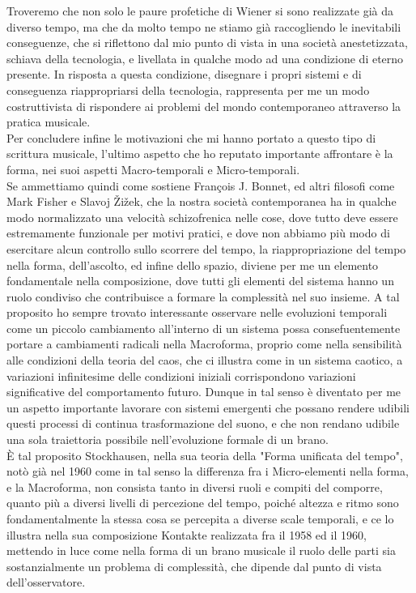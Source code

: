 Troveremo che non solo le paure profetiche di Wiener si sono realizzate già da diverso tempo, 
ma che da molto tempo ne stiamo già raccogliendo le inevitabili conseguenze,
che si riflettono dal mio punto di vista in una società anestetizzata, 
schiava della tecnologia, e livellata in qualche modo ad una condizione di eterno presente.
In risposta a questa condizione, disegnare i propri sistemi e di conseguenza riappropriarsi della tecnologia,
rappresenta per me un modo costruttivista di rispondere ai problemi del mondo contemporaneo
attraverso la pratica musicale.\\
Per concludere infine le motivazioni che mi hanno portato a questo tipo di scrittura musicale, 
l'ultimo aspetto che ho reputato importante affrontare è la forma,
nei suoi aspetti Macro-temporali e Micro-temporali. \\
Se ammettiamo quindi come sostiene François J. Bonnet, ed altri filosofi come Mark Fisher e Slavoj Žižek,
che la nostra società contemporanea ha in qualche modo normalizzato
una velocità schizofrenica nelle cose, dove tutto deve essere estremamente funzionale per motivi pratici,
e dove non abbiamo più modo di esercitare alcun controllo sullo scorrere del tempo,
la riappropriazione del tempo nella forma, dell'ascolto, ed infine dello spazio, diviene per me un elemento fondamentale
nella composizione,
dove tutti gli elementi del sistema hanno un ruolo condiviso che contribuisce a formare la complessità nel suo insieme.
A tal proposito ho sempre trovato interessante osservare nelle evoluzioni temporali 
come un piccolo cambiamento all'interno di un sistema possa consefuentemente portare a cambiamenti radicali
nella Macroforma, proprio come nella sensibilità alle condizioni della teoria del caos, 
che ci illustra come in un sistema caotico, a variazioni infinitesime delle condizioni iniziali 
corrispondono variazioni significative del comportamento futuro. 
Dunque in tal senso è diventato per me un aspetto importante lavorare con
sistemi emergenti che possano rendere udibili questi processi di continua trasformazione
del suono, e che non rendano udibile una sola traiettoria possibile nell'evoluzione formale
di un brano.\\
È tal proposito Stockhausen, nella sua teoria della "Forma unificata del tempo", 
notò già nel 1960 come in tal senso la differenza fra i Micro-elementi nella forma, 
e la Macroforma, non consista tanto in diversi ruoli e compiti del comporre,
quanto più a diversi livelli di percezione del tempo, 
poiché altezza e ritmo sono fondamentalmente la stessa cosa se percepita a diverse scale temporali,
e ce lo illustra nella sua composizione Kontakte realizzata fra il 1958 ed il 1960, mettendo in luce
come nella forma di un brano musicale il ruolo delle parti sia sostanzialmente un problema di complessità,
che dipende dal punto di vista dell'osservatore.

